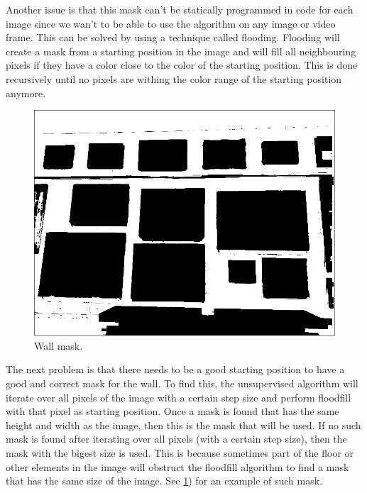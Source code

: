 Another issue is that this mask can't be statically programmed in code for each image since we wan't to be able to use the algorithm on any image or video frame. This can be solved by using a technique called flooding. Flooding will create a mask from a starting position in the image and will fill all neighbouring pixels if they have a color close to the color of the starting position. This is done recursively until no pixels are withing the color range of the starting position anymore.

\begin{figure}
    \includegraphics[width=\linewidth]{images/IMG_20190323_121447_wall-mask.jpg}
    \centering
    \caption{Wall mask.}
    \label{fig:paiting_detection_wall-mask}
\end{figure}

The next problem is that there needs to be a good starting position to have a good and correct mask for the wall. To find this, the unsupervised algorithm will iterate over all pixels of the image with a certain step size and perform floodfill with that pixel as starting position. Once a mask is found that has the same height and width as the image, then this is the mask that will be used. If no such mask is found after iterating over all pixels (with a certain step size), then the mask with the bigest size is used. This is because sometimes part of the floor or other elements in the image will obstruct the floodfill algorithm to find a mask that has the same size of the image. See \ref{fig:paiting_detection_wall-mask}) for an example of such mask.

